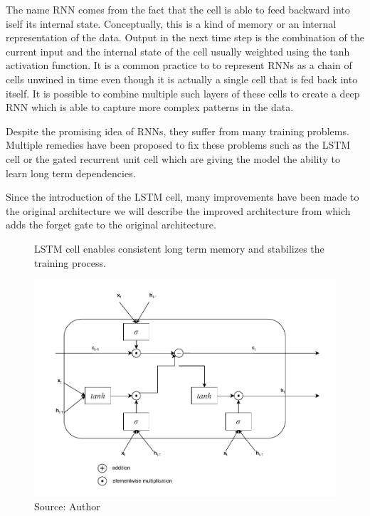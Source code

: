 The name \acl{RNN} comes from the fact that the cell is able
to feed backward into iself its internal state. Conceptually, this is a kind
of memory or an internal representation of the data. Output in the next
time step is the combination of the current input and the internal state
of the cell usually weighted using the tanh activation function. 
It is a common practice to to represent \ac{RNN}s as a chain of cells 
unwined in time even though it is actually a single cell that is fed back into itself.
It is possible to combine multiple such layers of these cells to create
a deep \ac{RNN} which is able to capture more complex patterns in the data.



Despite the promising idea of \ac{RNN}s, they suffer from many training problems.
Multiple remedies have been proposed to fix these problems such as the \ac{LSTM} cell
or the gated recurrent unit cell which are giving the model the ability to learn
long term dependencies.

Since the introduction of the \ac{LSTM} cell, many improvements have been made to the original
architecture we will describe the improved architecture from \cite{Gers2000} which
adds the forget gate to the original architecture. 

\newpage
\begin{figure}[!h]
    \centering
    \caption{\ac{LSTM} cell enables 
    consistent long term memory and stabilizes the training process.}
    \includegraphics[width=1\textwidth]{Figures/LSTM.drawio.pdf}
    \caption*{Source: Author}
    \label{fig:lstm_cell}
\end{figure}


